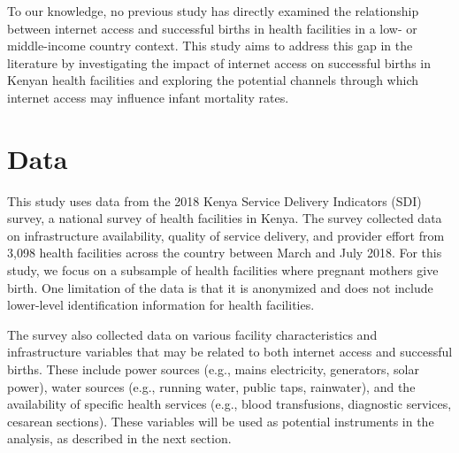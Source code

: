 \documentclass[12pt]{article}
\begin{document}
To our knowledge, no previous study has directly examined the relationship between internet access and successful births in health facilities in a low- or middle-income country context. This study aims to address this gap in the literature by investigating the impact of internet access on successful births in Kenyan health facilities and exploring the potential channels through which internet access may influence infant mortality rates.

\section{Data}
This study uses data from the 2018 Kenya Service Delivery Indicators (SDI) survey, a national survey of health facilities in Kenya. The survey collected data on infrastructure availability, quality of service delivery, and provider effort from 3,098 health facilities across the country between March and July 2018. For this study, we focus on a subsample of health facilities where pregnant mothers give birth. One limitation of the data is that it is anonymized and does not include lower-level identification information for health facilities.

The survey also collected data on various facility characteristics and infrastructure variables that may be related to both internet access and successful births. These include power sources (e.g., mains electricity, generators, solar power), water sources (e.g., running water, public taps, rainwater), and the availability of specific health services (e.g., blood transfusions, diagnostic services, cesarean sections). These variables will be used as potential instruments in the analysis, as described in the next section.
\end{document}
